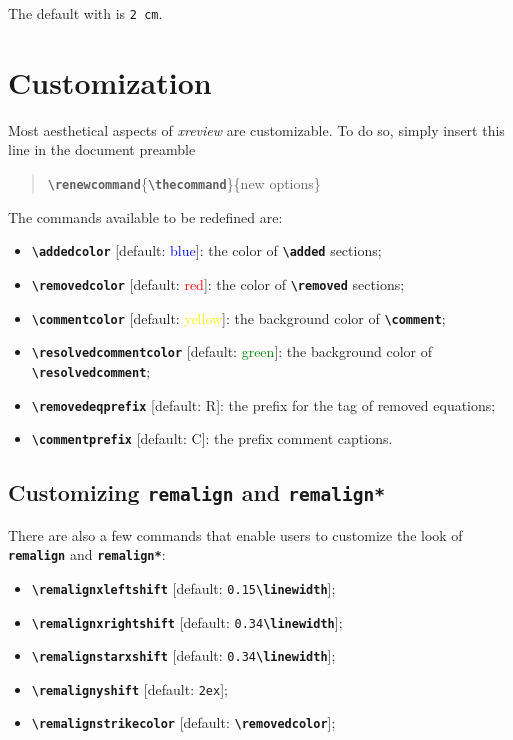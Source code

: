 \documentclass[a4paper]{ltxdoc}
\newcommand{\writecommand}[1]{\texttt{\textbf{{\textbackslash#1}}}}
\newcommand{\writeenv}[1]{\texttt{\textbf{{#1}}}}
\newcommand{\writearg}[1]{\{#1\}}
\begin{document}
The default with is \texttt{2 cm}.

\section{Customization}
\label{sec:custom}

Most aesthetical aspects of \textit{xreview} are customizable. To do so, simply insert this line in the document preamble
\begin{quote}
    \writecommand{renewcommand}\{\writecommand{thecommand}\}\writearg{new options}
\end{quote}

The commands available to be redefined are:
\begin{itemize}
    \item \writecommand{addedcolor} [default: \textcolor{blue}{blue}]: the color of \writecommand{added} sections;
    \item \writecommand{removedcolor} [default: \textcolor{red}{red}]: the color of \writecommand{removed} sections;
    \item \writecommand{commentcolor} [default: \textcolor{yellow}{yellow}]: the background color of \writecommand{comment};
    \item \writecommand{resolvedcommentcolor} [default: \textcolor{green}{green}]: the background color of \writecommand{resolvedcomment};
    \item \writecommand{removedeqprefix} [default: R]: the prefix for the tag of removed equations;
    \item \writecommand{commentprefix} [default: C]: the prefix comment captions.
\end{itemize}

\subsection{Customizing \writeenv{remalign} and \writeenv{remalign*}}
\label{sec:remalign-custom}

There are also a few commands that enable users to customize the look of \writeenv{remalign} and \writeenv{remalign*}:
\begin{itemize}
    \item \writecommand{remalignxleftshift} [default: \texttt{0.15}\writecommand{linewidth}];
    \item \writecommand{remalignxrightshift} [default: \texttt{0.34}\writecommand{linewidth}];
    \item \writecommand{remalignstarxshift} [default: \texttt{0.34}\writecommand{linewidth}];
    \item \writecommand{remalignyshift} [default: \texttt{2ex}];
    \item \writecommand{remalignstrikecolor} [default: \writecommand{removedcolor}];
\end{itemize}
\end{document}
